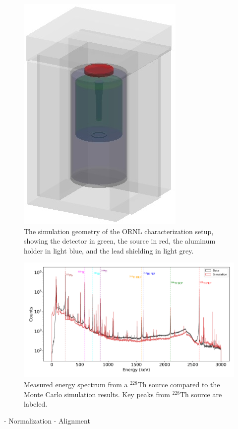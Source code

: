 \begin{figure}%
    \centering
    \includegraphics[width=0.4\linewidth]{ch7/figs/shielding.jpeg}
    \caption{The simulation geometry of the ORNL characterization setup, showing the detector in green, the source in red, the aluminum holder in light blue, and the lead shielding in light grey.}
   \label{fig:g4simple_setup}
\end{figure}


\begin{figure}%
    \includegraphics[width=0.99\linewidth,trim={1pc 0pc 1pc 0pc},clip]{ch7/figs/energy_spectrum_comparison.png}
    \caption{Measured energy spectrum from a $^{228}$Th source compared to the Monte Carlo simulation results. Key peaks from $^{228}$Th source are labeled.}
   \label{fig:eng_spec}
\end{figure}



- Normalization
- Alignment

